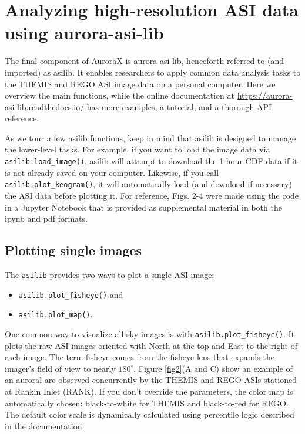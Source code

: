 \documentclass[utf8]{FrontiersinHarvard} %
\begin{document}
\section{Analyzing high-resolution ASI data using aurora-asi-lib}\label{aurora-asi-lib}
The final component of AuroraX is aurora-asi-lib, henceforth referred to (and imported) as asilib. It enables researchers to apply common data analysis tasks to the THEMIS and REGO ASI image data on a personal computer. Here we overview the main functions, while the online documentation at \url{https://aurora-asi-lib.readthedocs.io/} has more examples, a tutorial, and a thorough API reference.

As we tour a few asilib functions, keep in mind that asilib is designed to manage the lower-level tasks. For example, if you want to load the image data via \verb|asilib.load_image()|, asilib will attempt to download the 1-hour CDF data if it is not already saved on your computer. Likewise, if you call \verb|asilib.plot_keogram()|, it will automatically load (and download if necessary) the ASI data before plotting it. For reference, Figs. 2-4 were made using the code in a Jupyter Notebook that is provided as supplemental material in both the ipynb and pdf formats.

\subsection{Plotting single images}

The \verb|asilib| provides two ways to plot a single ASI image:

\begin{itemize}
      \item \verb|asilib.plot_fisheye()| and
      \item \verb|asilib.plot_map()|.
\end{itemize}

One common way to visualize all-sky images is with \verb|asilib.plot_fisheye()|. It plots the raw ASI images oriented with North at the top and East to the right of each image. The term fisheye comes from the fisheye lens that expands the imager's field of view to nearly $180^\circ$. Figure \ref{fig2}(A and C) show an example of an auroral arc observed concurrently by the THEMIS and REGO ASIs stationed at Rankin Inlet (RANK). If you don't override the parameters, the color map is automatically chosen: black-to-white for THEMIS and black-to-red for REGO. The default color scale is dynamically calculated using percentile logic described in the documentation.
\end{document}

